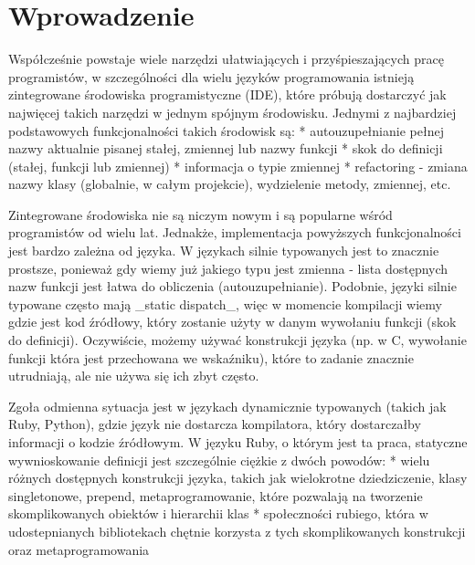 \documentclass[declaration,shortabstract]{iithesis}
\author         {Maksymilian Debeściak}
\begin{document}

\chapter{Wprowadzenie}

Współcześnie powstaje wiele narzędzi ułatwiających i przyśpieszających pracę programistów,
w szczególności dla wielu języków programowania istnieją zintegrowane środowiska programistyczne (IDE),
które próbują dostarczyć jak najwięcej takich narzędzi w jednym spójnym środowisku. Jednymi z najbardziej
podstawowych funkcjonalności takich środowisk są:
* autouzupełnianie pełnej nazwy aktualnie pisanej stałej, zmiennej lub nazwy funkcji
* skok do definicji (stałej, funkcji lub zmiennej)
* informacja o typie zmiennej
* refactoring - zmiana nazwy klasy (globalnie, w całym projekcie), wydzielenie metody, zmiennej, etc.

Zintegrowane środowiska nie są niczym nowym i są popularne wśród programistów od wielu lat.
Jednakże, implementacja powyższych funkcjonalności jest bardzo zależna od języka. W językach silnie typowanych jest to znacznie prostsze, ponieważ gdy wiemy już jakiego typu jest zmienna - lista dostępnych nazw funkcji jest łatwa do obliczenia (autouzupełnianie). Podobnie, języki silnie typowane często mają _static dispatch_, więc w momencie kompilacji wiemy gdzie jest kod źródłowy, który zostanie użyty w danym wywołaniu funkcji (skok do definicji). Oczywiście, możemy używać konstrukcji języka (np. w C, wywołanie funkcji która jest przechowana we wskaźniku), które to zadanie znacznie utrudniają, ale nie używa się ich zbyt często.

Zgoła odmienna sytuacja jest w językach dynamicznie typowanych (takich jak Ruby, Python), gdzie język nie dostarcza kompilatora, który dostarczałby informacji o kodzie źródłowym. W języku Ruby, o którym jest ta praca, statyczne wywnioskowanie definicji jest szczególnie ciężkie z dwóch powodów:
* wielu różnych dostępnych konstrukcji języka, takich jak wielokrotne dziedziczenie, klasy singletonowe, prepend, metaprogramowanie, które pozwalają na tworzenie skomplikowanych obiektów i hierarchii klas
* społeczności rubiego, która w udostepnianych bibliotekach chętnie korzysta z tych skomplikowanych konstrukcji oraz metaprogramowania


\end{document}
